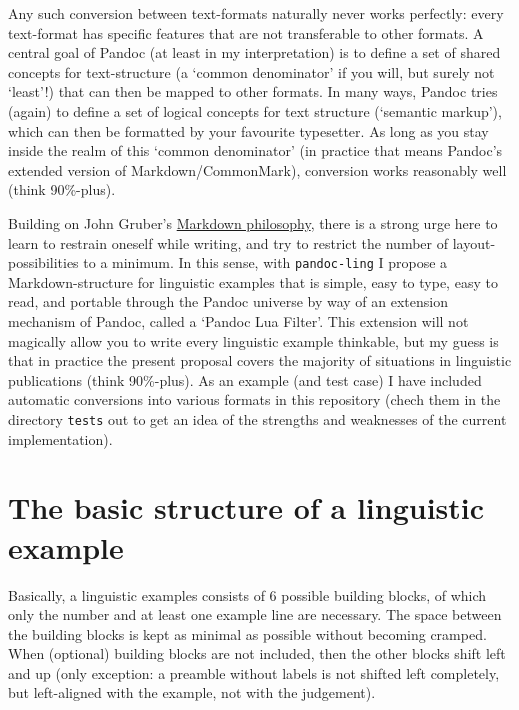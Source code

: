 \documentclass[
]{article}
\begin{document}
Any such conversion between text-formats naturally never works
perfectly: every text-format has specific features that are not
transferable to other formats. A central goal of Pandoc (at least in my
interpretation) is to define a set of shared concepts for text-structure
(a `common denominator' if you will, but surely not `least'!) that can
then be mapped to other formats. In many ways, Pandoc tries (again) to
define a set of logical concepts for text structure (`semantic markup'),
which can then be formatted by your favourite typesetter. As long as you
stay inside the realm of this `common denominator' (in practice that
means Pandoc's extended version of Markdown/CommonMark), conversion
works reasonably well (think 90\%-plus).

Building on John Gruber's
\href{https://daringfireball.net/projects/markdown/syntax}{Markdown
philosophy}, there is a strong urge here to learn to restrain oneself
while writing, and try to restrict the number of layout-possibilities to
a minimum. In this sense, with \texttt{pandoc-ling} I propose a
Markdown-structure for linguistic examples that is simple, easy to type,
easy to read, and portable through the Pandoc universe by way of an
extension mechanism of Pandoc, called a `Pandoc Lua Filter'. This
extension will not magically allow you to write every linguistic example
thinkable, but my guess is that in practice the present proposal covers
the majority of situations in linguistic publications (think 90\%-plus).
As an example (and test case) I have included automatic conversions into
various formats in this repository (chech them in the directory
\texttt{tests} out to get an idea of the strengths and weaknesses of the
current implementation).

\hypertarget{the-basic-structure-of-a-linguistic-example}{%
\section{The basic structure of a linguistic
example}\label{the-basic-structure-of-a-linguistic-example}}

Basically, a linguistic examples consists of 6 possible building blocks,
of which only the number and at least one example line are necessary.
The space between the building blocks is kept as minimal as possible
without becoming cramped. When (optional) building blocks are not
included, then the other blocks shift left and up (only exception: a
preamble without labels is not shifted left completely, but left-aligned
with the example, not with the judgement).
\end{document}
